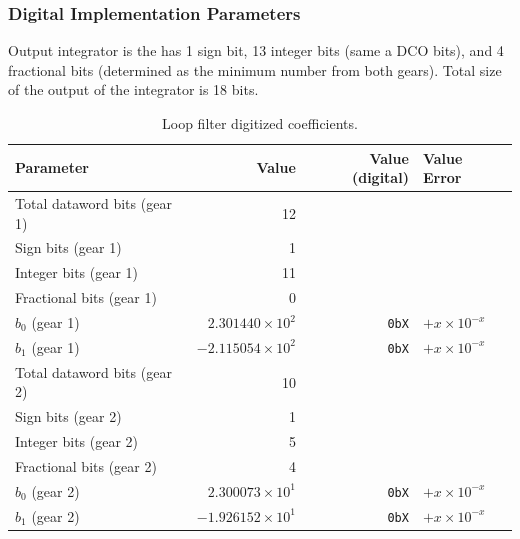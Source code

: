 		\subsubsection{Digital Implementation Parameters}
		Output integrator is the has 1 sign bit, 13 integer bits (same a DCO bits), and 4 fractional bits (determined as the minimum number from both gears). Total size of the output of the integrator is 18 bits.
		\begin{table}[h!]
			\centering
			\def\arraystretch{1.5}		
			\setlength\arrayrulewidth{0.75pt}
			\setlength{\tabcolsep}{1em} %
			\begin{tabular}{|l|r|r|l|}
				\hline 
				\rule[-1ex]{0pt}{2.5ex} \cellcolor{gray!40}\textbf{Parameter} & \cellcolor{gray!40}\textbf{Value} & \cellcolor{gray!40}\textbf{Value (digital) } & \cellcolor{gray!40}\textbf{Value Error}\\ 
				\hline 
				\rule[-1ex]{0pt}{2.5ex} Total dataword bits {\color{red} (gear 1)} & 12 & & \\ 
				\hline 
				\rule[-1ex]{0pt}{2.5ex} Sign bits {\color{red} (gear 1)} & 1 & & \\ 
				\hline 
				\rule[-1ex]{0pt}{2.5ex} Integer bits {\color{red} (gear 1)} & 11 & & \\ 
				\hline 
				\rule[-1ex]{0pt}{2.5ex} Fractional bits {\color{red} (gear 1)} & 0 & & \\ 
				\hline 
				\rule[-1ex]{0pt}{2.5ex} \textbf{$b_0$} {\color{red} (gear 1)} & $2.301440\times10^2$ & \texttt{0bX}  & $+x\times10^{-x}$\\
				\hline 
				\rule[-1ex]{0pt}{2.5ex} \textbf{$b_1$} {\color{red} (gear 1)} & $-2.115054\times10^2$ & \texttt{0bX}  & $+x\times10^{-x}$\\
				\hline 
				\rule[-1ex]{0pt}{2.5ex} Total dataword bits {\color{blue} (gear 2)} & 10 & & \\ 
				\hline 
				\rule[-1ex]{0pt}{2.5ex} Sign bits {\color{blue} (gear 2)} & 1 & & \\ 
				\hline 
				\rule[-1ex]{0pt}{2.5ex} Integer bits {\color{blue} (gear 2)} & 5 & & \\ 
				\hline 
				\rule[-1ex]{0pt}{2.5ex} Fractional bits {\color{blue} (gear 2)} & 4 & & \\ 
				\hline 
				\rule[-1ex]{0pt}{2.5ex} \textbf{$b_0$} {\color{blue} (gear 2)} & $2.300073\times10^1$ & \texttt{0bX}  & $+x\times10^{-x}$ \\
				\hline 
				\rule[-1ex]{0pt}{2.5ex} \textbf{$b_1$} {\color{blue} (gear 2)} & $-1.926152\times10^1$ & \texttt{0bX}  & $+x\times10^{-x}$\\
				\hline 
			\end{tabular} 
			\caption{Loop filter digitized coefficients.}
			\label{dig_filter_params_fast}
		\end{table}  

